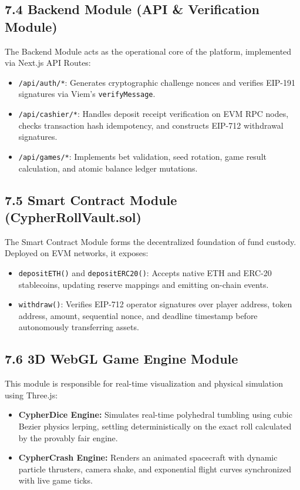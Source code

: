 \subsection*{7.4 Backend Module (API \& Verification Module)}
The Backend Module acts as the operational core of the platform, implemented via Next.js API Routes:
\begin{itemize}[leftmargin=1.5em]
    \item \texttt{/api/auth/*}: Generates cryptographic challenge nonces and verifies EIP-191 signatures via Viem's \texttt{verifyMessage}.
    \item \texttt{/api/cashier/*}: Handles deposit receipt verification on EVM RPC nodes, checks transaction hash idempotency, and constructs EIP-712 withdrawal signatures.
    \item \texttt{/api/games/*}: Implements bet validation, seed rotation, game result calculation, and atomic balance ledger mutations.
\end{itemize}

\subsection*{7.5 Smart Contract Module (CypherRollVault.sol)}
The Smart Contract Module forms the decentralized foundation of fund custody. Deployed on EVM networks, it exposes:
\begin{itemize}[leftmargin=1.5em]
    \item \texttt{depositETH()} and \texttt{depositERC20()}: Accepts native ETH and ERC-20 stablecoins, updating reserve mappings and emitting on-chain events.
    \item \texttt{withdraw()}: Verifies EIP-712 operator signatures over player address, token address, amount, sequential nonce, and deadline timestamp before autonomously transferring assets.
\end{itemize}

\subsection*{7.6 3D WebGL Game Engine Module}
This module is responsible for real-time visualization and physical simulation using Three.js:
\begin{itemize}[leftmargin=1.5em]
    \item \textbf{CypherDice Engine:} Simulates real-time polyhedral tumbling using cubic Bezier physics lerping, settling deterministically on the exact roll calculated by the provably fair engine.
    \item \textbf{CypherCrash Engine:} Renders an animated spacecraft with dynamic particle thrusters, camera shake, and exponential flight curves synchronized with live game ticks.
\end{itemize}

